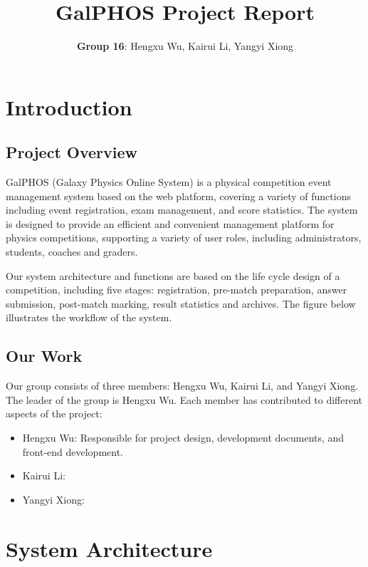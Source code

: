 \documentclass[12pt]{article}
\title{GalPHOS Project Report}
\author{\textbf{Group 16}: Hengxu Wu, Kairui Li, Yangyi Xiong}
\date{}
\begin{document}
\maketitle

\section{Introduction}
\subsection{Project Overview}

GalPHOS (Galaxy Physics Online System) is a physical competition event management system based on the web platform, covering a variety of functions including event registration, exam management, and score statistics. The system is designed to provide an efficient and convenient management platform for physics competitions, supporting a variety of user roles, including administrators, students, coaches and graders.

Our system architecture and functions are based on the life cycle design of a competition, including five stages: registration, pre-match preparation, answer submission, post-match marking, result statistics and archives. The figure below illustrates the workflow of the system.

\subsection{Our Work}

Our group consists of three members: Hengxu Wu, Kairui Li, and Yangyi Xiong. The leader of the group is Hengxu Wu. Each member has contributed to different aspects of the project:
\begin{itemize}
    \item Hengxu Wu: Responsible for project design, development documents, and front-end development.
    \item Kairui Li: %
    \item Yangyi Xiong: %
\end{itemize}

\section{System Architecture}
\end{document}
